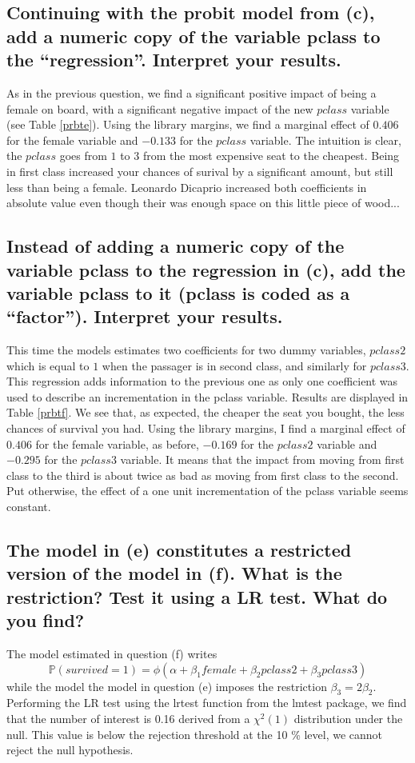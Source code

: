 \documentclass[12pt]{article}
\begin{document}
\subsection{Continuing with the probit model from (c), add a numeric copy of the variable pclass to the “regression”. Interpret your results.}
As in the previous question, we find a significant positive impact of being a female on board, with a significant negative impact of the new $pclass$ variable (see Table \ref{prbte}). Using the library margins, we find a marginal effect of $0.406$ for the female variable and $-0.133$ for the $pclass$ variable. The intuition is clear, the $pclass$ goes from $1$ to $3$ from the most expensive seat to the cheapest. Being in first class increased your chances of surival by a significant amount, but still less than being a female. Leonardo Dicaprio increased both coefficients in absolute value even though their was enough space on this little piece of wood...


\subsection{Instead of adding a numeric copy of the variable pclass to the regression in (c), add the variable pclass to it (pclass is coded as a “factor”). Interpret your results.}
This time the models estimates two coefficients for two dummy variables, $pclass2$ which is equal to $1$ when the passager is in second class, and similarly for $pclass3$. This regression adds information to the previous one as only one coefficient was used to describe an incrementation in the pclass variable. Results are displayed in Table \ref{prbtf}. We see that, as expected, the cheaper the seat you bought, the less chances of survival you had. Using the library margins, I find a marginal effect of $0.406$ for the female variable, as before, $-0.169$ for the $pclass2$ variable and $-0.295$ for the $pclass3$ variable. It means that the impact from moving from first class to the third is about twice as bad as moving from first class to the second. Put otherwise, the effect of a one unit incrementation of the pclass variable seems constant.


\subsection{The model in (e) constitutes a restricted version of the model in (f). What is the restriction? Test it using a LR test. What do you find?}
The model estimated in question (f) writes
$$\mathbb{P}(survived = 1) = \phi(\alpha + \beta_1 female + \beta_2 pclass2 + \beta_3 pclass 3)$$
while the model the model in question (e) imposes the restriction $\beta_3 = 2 \beta_2$.
Performing the LR test using the lrtest function from the lmtest package, we find that the number of interest is 0.16 derived from a $\chi^2(1)$ distribution under the null. This value is below the rejection threshold at the 10 \% level, we cannot reject the null hypothesis.
\end{document}
